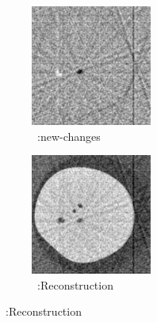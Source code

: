 \documentclass{article}
\begin{document}
\begin{figure}[!h]
    \begin{subfigure}[b]{0.4\linewidth}
        \includegraphics[width=\textwidth]{../images/comparison_lit/result_new_changes.png}
        \caption{~\cite{Lee2012}:new-changes}
     \end{subfigure}
\quad
    \begin{subfigure}[b]{0.4\linewidth}
        \includegraphics[width=\textwidth]{../images/comparison_lit/result_literature_test.png}
        \caption{~\cite{Lee2012}:Reconstruction}
    \end{subfigure}


\end{figure}
\end{document}
